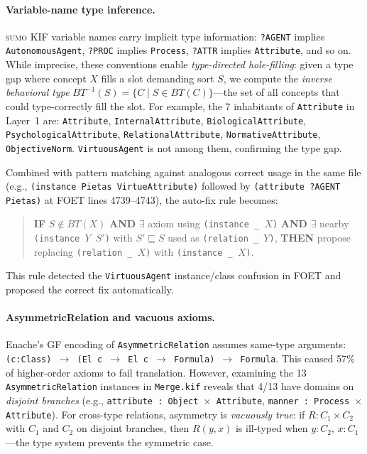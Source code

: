 \documentclass[11pt]{article}
\newcommand{\SUMO}{\textsc{sumo}}
\theoremstyle{definition}
\theoremstyle{plain}
\begin{document}
\paragraph{Variable-name type inference.}
\SUMO{} KIF variable names carry implicit type information:
\texttt{?AGENT} implies \texttt{AutonomousAgent},
\texttt{?PROC} implies \texttt{Process},
\texttt{?ATTR} implies \texttt{Attribute}, and so on.
While imprecise, these conventions enable \emph{type-directed
hole-filling}: given a type gap where concept $X$ fills a slot
demanding sort $S$, we compute the \emph{inverse behavioral type}
$\mathit{BT}^{-1}(S) = \{C \mid S \in \mathit{BT}(C)\}$---the
set of all concepts that could type-correctly fill the slot.
For example, the 7 inhabitants of \texttt{Attribute} in Layer~1
are: \texttt{Attribute}, \texttt{InternalAttribute},
\texttt{BiologicalAttribute}, \texttt{PsychologicalAttribute},
\texttt{RelationalAttribute}, \texttt{NormativeAttribute},
\texttt{ObjectiveNorm}.  \texttt{VirtuousAgent} is not among them,
confirming the type gap.

Combined with pattern matching against analogous correct usage
in the same file (e.g., \texttt{(instance Pietas VirtueAttribute)}
followed by \texttt{(attribute ?AGENT Pietas)} at FOET lines
4739--4743), the auto-fix rule becomes:
\begin{quote}\small
\textbf{IF} $S \notin \mathit{BT}(X)$
\textbf{AND} $\exists$ axiom using \texttt{(instance \_ $X$)}
\textbf{AND} $\exists$ nearby \texttt{(instance $Y$ $S'$)} with
$S' \sqsubseteq S$ used as \texttt{(relation \_ $Y$)},
\textbf{THEN} propose replacing \texttt{(relation \_ $X$)} with
\texttt{(instance \_ $X$)}.
\end{quote}
This rule detected the \texttt{VirtuousAgent} instance/class
confusion in FOET and proposed the correct fix automatically.

\paragraph{AsymmetricRelation and vacuous axioms.}
Enache's GF encoding of \texttt{AsymmetricRelation} assumes
same-type arguments: \texttt{(c:Class) $\to$ (El c $\to$ El c $\to$
Formula) $\to$ Formula}.  This caused 57\% of higher-order axioms
to fail translation.  However, examining the 13
\texttt{AsymmetricRelation} instances in \texttt{Merge.kif} reveals
that 4/13 have domains on \emph{disjoint branches} (e.g.,
\texttt{attribute : Object $\times$ Attribute},
\texttt{manner : Process $\times$ Attribute}).
For cross-type relations, asymmetry is \emph{vacuously true}:
if $R : C_1 \times C_2$ with $C_1$ and $C_2$ on disjoint branches,
then $R(y,x)$ is ill-typed when $y : C_2$, $x : C_1$---the type
system prevents the symmetric case.
\end{document}
